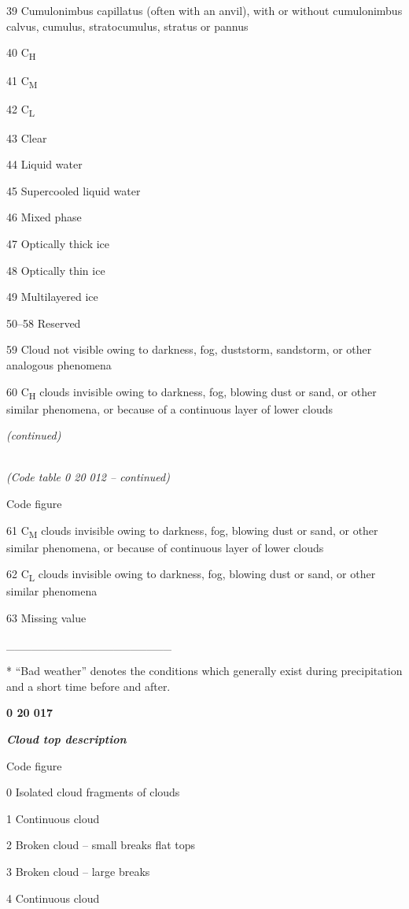 39 Cumulonimbus capillatus (often with an anvil), with or without cumulonimbus calvus, cumulus, stratocumulus, stratus or pannus

40 C\textsubscript{H}

41 C\textsubscript{M}

42 C\textsubscript{L}

43 Clear

44 Liquid water

45 Supercooled liquid water

46 Mixed phase

47 Optically thick ice

48 Optically thin ice

49 Multilayered ice

50--58 Reserved

59 Cloud not visible owing to darkness, fog, duststorm, sandstorm, or other analogous phenomena

60 C\textsubscript{H} clouds invisible owing to darkness, fog, blowing dust or sand, or other similar phenomena, or because of a continuous layer of lower clouds

\emph{(continued)}

\emph{\\
(Code table 0 20 012 -- continued)}

Code figure

61 C\textsubscript{M} clouds invisible owing to darkness, fog, blowing dust or sand, or other similar phenomena, or because of continuous layer of lower clouds

62 C\textsubscript{L} clouds invisible owing to darkness, fog, blowing dust or sand, or other similar phenomena

63 Missing value

\_\_\_\_\_\_\_\_\_\_\_\_\_\_\_\_\_\_\_\_

* ``Bad weather'' denotes the conditions which generally exist during precipitation and a short time before and after.

\textbf{0 20 017}

\emph{\textbf{Cloud top description}}

Code figure

0 Isolated cloud fragments of clouds

1 Continuous cloud

2 Broken cloud -- small breaks flat tops

3 Broken cloud -- large breaks

4 Continuous cloud


